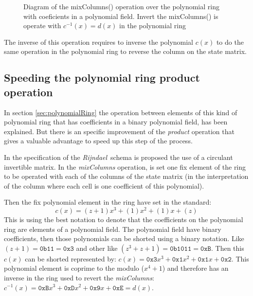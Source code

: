 \documentclass[10pt,a4paper,twoside]{llncs}
\newcommand{\rijndael}{\emph{Rijndael}}
\begin{document}

\begin{figure}[h]
\begin{center}

\caption{Diagram of the mixColumns() operation over the polynomial ring with coeficients in a polynomial field. Invert the mixColumns() is operate with $c^{-1}(x)=d(x)$ in the polynomial ring}
\label{fig:mixColumns}
\end{center}
\end{figure}

The inverse of this operation requires to inverse the polynomial $c(x)$ to do the same operation in the polynomial ring to reverse the column on the state matrix.

\subsection{Speeding the polynomial ring product operation}\label{sec:improvePolynomialRingProduct}
In section \ref{sec:polynomialRing} the operation between elements of this kind of polynomial ring that has coefficients in a binary polynomial field, has been explained. But there is an specific improvement of the \emph{product} operation that gives a valuable advantage to speed up this step of the process. 

In the specification of the \rijndael\, schema \cite{Daemen01aes-ammended} is proposed the use of a circulant invertible matrix. In the \emph{mixColumns} operation, is set one fix element of the ring to be operated with each of the columns of the state matrix (in the interpretation of the column where each cell is one coefficient of this polynomial).

Then the fix polynomial element in the ring have set in the standard:
$$c(x) = (z+1)x^3+(1)x^2+(1)x+(z)$$
This is using the best notation to denote that the coefficients on the polynomial ring are elements of a polynomial field. The polynomial field have binary coefficients, then those polynomials can be shorted using a binary notation. Like $(z+1)=\texttt{0b11}=\texttt{0x3}$ and other like $(z^3+z+1)=\texttt{0b1011}=\texttt{0xB}$. Then this $c(x)$ can be shorted represented by: $c(x) = \texttt{0x3}x^3+\texttt{0x1}x^2+\texttt{0x1}x+\texttt{0x2}$. This polynomial element is coprime to the modulo ($x^4+1$) and therefore has an inverse in the ring used to revert the \emph{mixColumns}: $c^{-1}(x) = \texttt{0xB}x^3+\texttt{0xD}x^2+\texttt{0x9}x+\texttt{0xE}=d(x)$.
\end{document}
